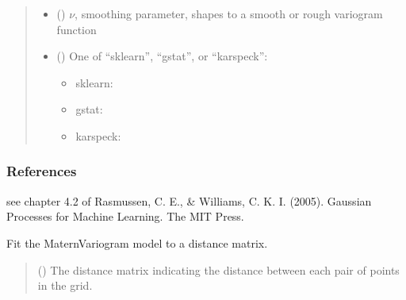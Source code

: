 \documentclass[letterpaper,10pt,english]{sphinxmanual}
\begin{document}
\begin{fulllineitems}
\begin{quote}
\begin{description}
\begin{itemize}
\item {}
\sphinxAtStartPar
{} (\sphinxstyleliteralemphasis{\sphinxupquote{ | }}) \textendash{} \(\nu\), smoothing parameter, shapes to a smooth or rough variogram
function

\item {}
\sphinxAtStartPar
{} () \textendash{}
\sphinxAtStartPar
One of “sklearn”, “gstat”, or “karspeck”:
\begin{itemize}
\item {}
\sphinxAtStartPar
sklearn: 

\item {}
\sphinxAtStartPar
gstat: 

\item {}
\sphinxAtStartPar
karspeck: 

\end{itemize}


\end{itemize}

\end{description}\end{quote}
\subsubsection*{References}

\sphinxAtStartPar
see chapter 4.2 of Rasmussen, C. E., \& Williams, C. K. I. (2005).
Gaussian Processes for Machine Learning. The MIT Press.

\begin{fulllineitems}
\label{\detokenize{covariance:glomar_gridding.variogram.MaternVariogram.fit}}
\pysigstartsignatures
\pysiglinewithargsret
{}
{}
{}
\pysigstopsignatures
\sphinxAtStartPar
Fit the MaternVariogram model to a distance matrix.
\begin{quote}\begin{description}
\sphinxAtStartPar
{} (\sphinxstyleliteralemphasis{\sphinxupquote{ | }}) \textendash{} The distance matrix indicating the distance between each pair of
points in the grid.


\end{description}
\end{quote}
\end{fulllineitems}
\end{fulllineitems}
\end{document}
